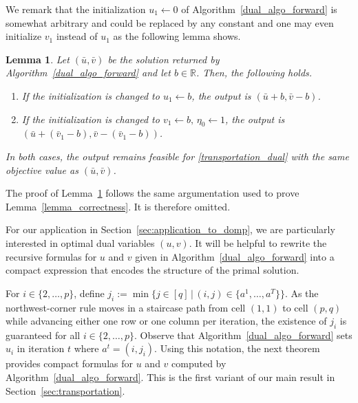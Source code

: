 \documentclass[letterpaper]{article}
\newtheorem{lemma}[theorem]{Lemma}
\begin{document}
We remark that the initialization $u_1 \gets 0$ of Algorithm~\ref{dual_algo_forward} is somewhat arbitrary and could be replaced by any constant and one may even initialize $v_1$ instead of $u_1$ as the following lemma shows.

\begin{lemma}\label{lemma_initialization}
    Let $(\bar{u}, \bar{v})$ be the solution returned by Algorithm~\ref{dual_algo_forward} and let $b \in \mathbb{R}$. Then, the following holds.
    \begin{enumerate}
        \item[(i)] If the initialization is changed to $u_1 \gets b$, the output is $(\bar{u}+b, \bar{v}-b)$.
        \item[(ii)] If the initialization is changed to $v_1 \gets b, \, \eta_0 \gets 1$, the output is $(\bar{u} + (\bar{v}_1 - b), \bar{v} - (\bar{v}_1 - b))$.
    \end{enumerate}
    In both cases, the output remains feasible for \eqref{transportation_dual} with the same objective value as $(\bar{u}, \bar{v})$.
\end{lemma}

The proof of Lemma~\ref{lemma_initialization} follows the same argumentation used to prove Lemma~\ref{lemma_correctness}. It is therefore omitted.

For our application in Section~\ref{sec:application_to_domp}, we are particularly interested in optimal dual variables $(u, v)$. It will be helpful to rewrite the recursive formulas for $u$ and $v$ given in Algorithm~\ref{dual_algo_forward} into a compact expression that encodes the structure of the primal solution.

For $i \in \{2, \dots, p\}$, define $j_i := \min \{j \in [q] \, | \, (i,j) \in \{a^1, \dots, a^T\}\}$. As the northwest-corner rule moves in a staircase path from cell $(1,1)$ to cell $(p,q)$ while advancing either one row or one column per iteration, the existence of $j_i$ is guaranteed for all $i \in \{2, \dots, p\}$. Observe that Algorithm~\ref{dual_algo_forward} sets $u_i$ in iteration $t$ where $a^t = (i, j_i)$. Using this notation, the next theorem provides compact formulas for $u$ and $v$ computed by Algorithm~\ref{dual_algo_forward}. This is the first variant of our main result in Section~\ref{sec:transportation}.
\end{document}
